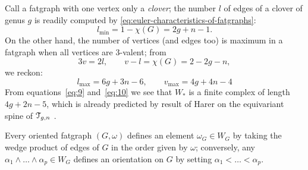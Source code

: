 Call a fatgraph with one vertex only a \emph{clover}; the number $l$
of edges of a clover of genus $g$ is readily computed by
\eqref{eq:euler-characteristics-of-fatgraphs}:
\begin{equation}
  \label{eq:9}
  l_{\min} = 1 - \chi(G) = 2g + n - 1.
\end{equation}
On the other hand, the number of vertices (and edges too) is maximum
in a fatgraph when all vertices are 3-valent; from
\begin{equation*}
  3v = 2l, 
  \qquad
  v - l = \chi(G) = 2 - 2g - n,
\end{equation*}
we reckon:
\begin{equation}
  \label{eq:10}
  l_{\max} = 6g + 3n - 6, 
  \qquad 
  v_{\max} = 4g + 4n - 4
\end{equation}
From equations~\eqref{eq:9} and~\eqref{eq:10} we see that $W_*$ is a
finite complex of length $4g + 2n - 5$, which is already predicted by
result of Harer on the equivariant spine of $\mathcal{T}_{g,n}$
\cite{harer;cohomological-dimension}.

Every oriented fatgraph $(G, \omega)$ defines an element $\omega_G \in W_G$ by
taking the wedge product of edges of $G$ in the order given by $\omega$;
conversely, any $\alpha_1 \land \ldots \land \alpha_p \in W_G$ defines an orientation on $G$ by
setting $\alpha_1 < \ldots < \alpha_p$.

